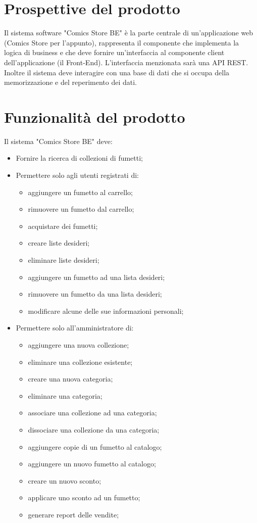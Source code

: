 \documentclass{scrreprt}
\begin{document}
\section{Prospettive del prodotto}
Il sistema software "Comics Store BE" è la parte centrale di un'applicazione web (Comics Store per l'appunto),
rappresenta il componente che implementa la logica di business e che deve fornire un'interfaccia al componente client
dell'applicazione (il Front-End). L'interfaccia menzionata sarà una API REST.
Inoltre il sistema deve interagire con una base di dati che si occupa della memorizzazione e del reperimento dei dati.

\section{Funzionalità del prodotto}
Il sistema "Comics Store BE" deve:
\begin{itemize}
    \item Fornire la ricerca di collezioni di fumetti;
    \item Permettere solo agli utenti registrati di:
        \begin{itemize}
            \item aggiungere un fumetto al carrello;
            \item rimuovere un fumetto dal carrello;
            \item acquistare dei fumetti;
            \item creare liste desideri;
            \item eliminare liste desideri;
            \item aggiungere un fumetto ad una lista desideri;
            \item rimuovere un fumetto da una lista desideri;
            \item modificare alcune delle sue informazioni personali;
        \end{itemize}
    \item Permettere solo all'amministratore di:
        \begin{itemize}
            \item aggiungere una nuova collezione;
            \item eliminare una collezione esistente;
            \item creare una nuova categoria;
            \item eliminare una categoria;
            \item associare una collezione ad una categoria;
            \item dissociare una collezione da una categoria;
            \item aggiungere copie di un fumetto al catalogo;
            \item aggiungere un nuovo fumetto al catalogo;
            \item creare un nuovo sconto;
            \item applicare uno sconto ad un fumetto;
            \item generare report delle vendite;
        \end{itemize}
\end{itemize}
\end{document}
